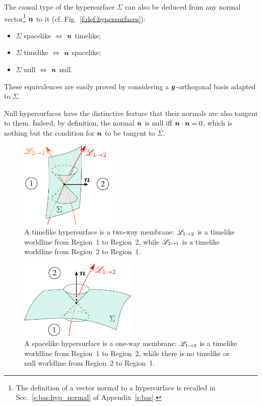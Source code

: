 The causal type of the hypersurface $\Sigma$
can also be deduced from any normal vector\footnote{
The definition of a vector normal to a hypersurface is recalled in Sec.~\ref{s:bas:hyp_normal} of Appendix~\ref{s:bas}.}
$\bm{n}$ to it (cf. Fig.~\ref{f:def:hypersurfaces}):
\begin{itemize}
\item $\Sigma$ spacelike $\iff$ $\bm{n}$ timelike;
\item $\Sigma$ timelike $\iff$ $\bm{n}$ spacelike;
\item $\Sigma$ null $\iff$ $\bm{n}$ null.
\end{itemize}
These equivalences are easily proved by considering a $\bm{g}$-orthogonal basis
adapted to $\Sigma$.

\begin{remark}
Null hypersurfaces have the distinctive feature that their normals are
also tangent to them. Indeed, by definition, the normal $\bm{n}$ is null iff
$\bm{n}\cdot\bm{n}=0$, which is nothing but the condition
for $\bm{n}$ to be tangent to $\Sigma$.
\end{remark}

\begin{figure}
\centerline{\includegraphics[width=0.4\textwidth]{def_timelike_2way.pdf}}
\caption[]{\label{f:def:timelike_2way} \footnotesize
A timelike hypersurface is a two-way membrane: $\mathscr{L}_{1\rightarrow 2}$ is
a timelike worldline from Region~1 to Region~2, while $\mathscr{L}_{2\rightarrow 1}$ is
a timelike worldline from Region~2 to Region~1.}
\end{figure}

\begin{figure}
\centerline{\includegraphics[width=0.5\textwidth]{def_spacelike_1way.pdf}}
\caption[]{\label{f:def:spacelike_1way} \footnotesize
A spacelike hypersurface is a one-way membrane: $\mathscr{L}_{1\rightarrow 2}$ is
a timelike worldline from Region~1 to Region~2, while there is no timelike or null
worldline from Region~2 to Region~1.}
\end{figure}


